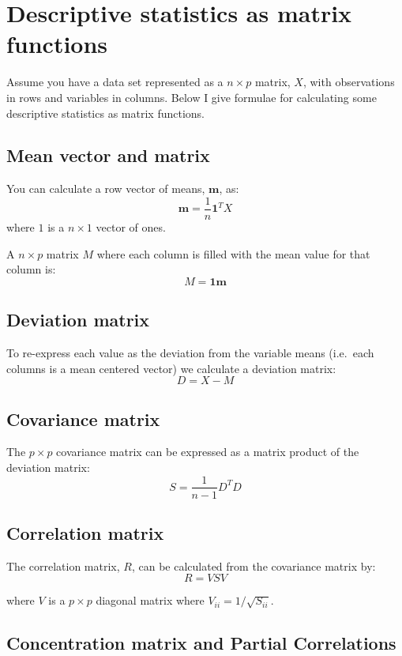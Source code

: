 
\section{Descriptive statistics as matrix functions}

Assume you have a data set represented as a $n \times p$ matrix, $X$, with
observations in rows and variables in columns. Below I give formulae for
calculating some descriptive statistics as matrix functions.

\subsection{Mean vector and matrix}

You can calculate a row vector of means, $\mathbf{m}$, as: 
\[
\mathbf{m} = \frac{1}{n} \mathbf{1}^T  X
\] where $1$ is a $n \times 1$ vector of ones.

A $n \times p$ matrix $M$ where each column is filled with the mean
value for that column is: 
\[
M = \mathbf{1}\mathbf{m}
\]

\subsection{Deviation matrix}

To re-express each value as the deviation from the variable means
(i.e.~each columns is a mean centered vector) we calculate a deviation
matrix: 
\[
D = X - M
\]

\subsection{Covariance matrix}

The $p \times p$ covariance matrix can be expressed as a matrix product of the deviation matrix:
\[
S = \frac{1}{n-1} D^T D
\]

\subsection{Correlation matrix}

The correlation matrix, $R$, can be calculated from the covariance
matrix by: 
\[
R = V S V
\]

where $V$ is a $p \times p$ diagonal matrix where
$V_{ii} = 1/\sqrt{S_{ii}}$.

\subsection{Concentration matrix and Partial Correlations}

